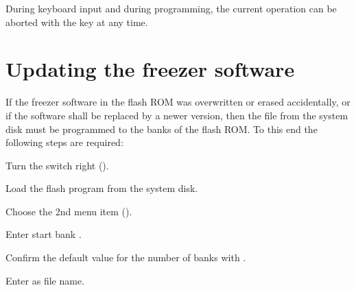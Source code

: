 During keyboard input and during programming, the current operation can be
aborted with the  key at any time.

\section{Updating the freezer software}
If the freezer software in the flash ROM was overwritten or erased
accidentally, or if the software shall be replaced by a newer version, then
the file  from the system disk must be programmed to the banks
 of the flash ROM. To this end the following steps are required:

\begin{enumerate*}
\item Turn the  switch right ().
\item Load the flash program  from the system disk.
\item Choose the 2nd menu item ().
\item Enter start bank .
\item Confirm the default value  for the number of banks with .
\item Enter  as file name.
\end{enumerate*}
